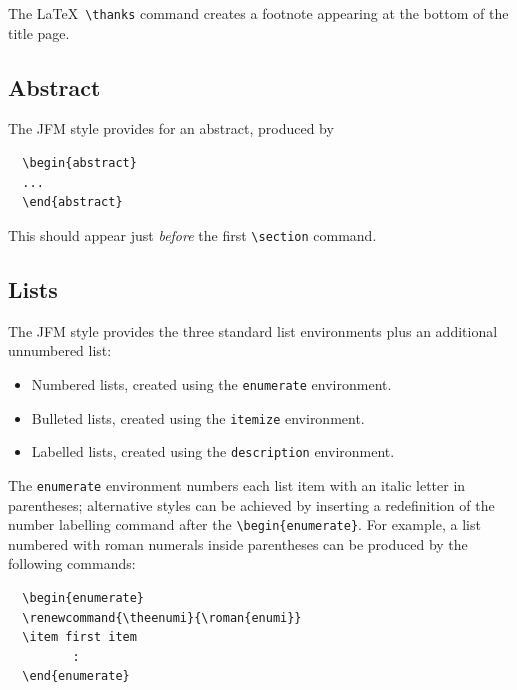 The \LaTeX\ \verb"\thanks" command creates a footnote appearing at the bottom
of the title page.


\subsection{Abstract}

The JFM style provides for an abstract, produced by

\smallskip
\begin{verbatim}
  \begin{abstract}
  ...
  \end{abstract}
\end{verbatim}
\smallskip

This should appear just {\em before} the first \verb"\section" command.

\subsection{Lists}

The JFM style provides the three standard list environments plus an additional
unnumbered list:
\begin{itemize}
  \item Numbered lists, created using the \verb"enumerate" environment.
  \item Bulleted lists, created using the \verb"itemize" environment.
  \item Labelled lists, created using the \verb"description" environment.
\end{itemize}
The \verb"enumerate" environment numbers each list item with an italic
letter in parentheses;
alternative styles can be achieved by inserting a redefinition of the
number labelling command after the \verb"\begin{enumerate}". For example, a
list numbered with roman numerals inside parentheses can be produced by the
following commands:

\smallskip
\begin{verbatim}
  \begin{enumerate}
  \renewcommand{\theenumi}{\roman{enumi}}
  \item first item
         :
  \end{enumerate}
\end{verbatim}
\smallskip

